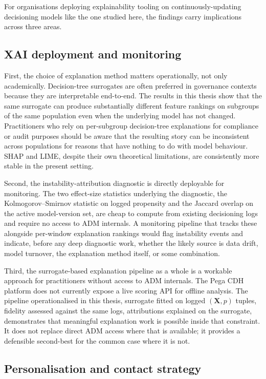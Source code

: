 \documentclass[oneside]{memoir} %
\begin{document}
For organisations deploying explainability tooling on continuously-updating decisioning models like the one studied here, the findings carry implications across three areas.

\subsection*{XAI deployment and monitoring}

First, the choice of explanation method matters operationally, not only academically. Decision-tree surrogates are often preferred in governance contexts because they are interpretable end-to-end. The results in this thesis show that the same surrogate can produce substantially different feature rankings on subgroups of the same population even when the underlying model has not changed. Practitioners who rely on per-subgroup decision-tree explanations for compliance or audit purposes should be aware that the resulting story can be inconsistent across populations for reasons that have nothing to do with model behaviour. SHAP and LIME, despite their own theoretical limitations, are consistently more stable in the present setting.

Second, the instability-attribution diagnostic is directly deployable for monitoring. The two effect-size statistics underlying the diagnostic, the Kolmogorov--Smirnov statistic on logged propensity and the Jaccard overlap on the active model-version set, are cheap to compute from existing decisioning logs and require no access to ADM internals. A monitoring pipeline that tracks these alongside per-window explanation rankings would flag instability events and indicate, before any deep diagnostic work, whether the likely source is data drift, model turnover, the explanation method itself, or some combination.

Third, the surrogate-based explanation pipeline as a whole is a workable approach for practitioners without access to ADM internals. The Pega CDH platform does not currently expose a live scoring API for offline analysis. The pipeline operationalised in this thesis, surrogate fitted on logged $(\mathbf{X}, p)$ tuples, fidelity assessed against the same logs, attributions explained on the surrogate, demonstrates that meaningful explanation work is possible inside that constraint. It does not replace direct ADM access where that is available; it provides a defensible second-best for the common case where it is not.

\subsection*{Personalisation and contact strategy}
\end{document}
